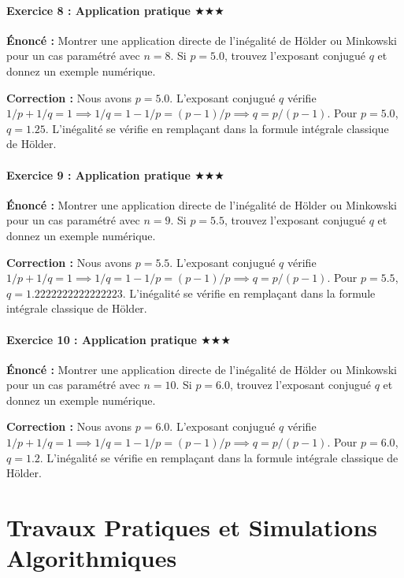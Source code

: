 \documentclass[11pt,a4paper]{article}
\begin{document}
\subsection*{Exercice 8 : Application pratique $\bigstar\bigstar\bigstar$}

\textbf{Énoncé :}
Montrer une application directe de l'inégalité de Hölder ou Minkowski pour un cas paramétré avec $n=8$.
Si $p=5.0$, trouvez l'exposant conjugué $q$ et donnez un exemple numérique.

\textbf{Correction :}
Nous avons $p = 5.0$.
L'exposant conjugué $q$ vérifie $1/p + 1/q = 1 \implies 1/q = 1 - 1/p = (p-1)/p \implies q = p/(p-1)$.
Pour $p = 5.0$, $q = 1.25$.
L'inégalité se vérifie en remplaçant dans la formule intégrale classique de Hölder.


\subsection*{Exercice 9 : Application pratique $\bigstar\bigstar\bigstar$}

\textbf{Énoncé :}
Montrer une application directe de l'inégalité de Hölder ou Minkowski pour un cas paramétré avec $n=9$.
Si $p=5.5$, trouvez l'exposant conjugué $q$ et donnez un exemple numérique.

\textbf{Correction :}
Nous avons $p = 5.5$.
L'exposant conjugué $q$ vérifie $1/p + 1/q = 1 \implies 1/q = 1 - 1/p = (p-1)/p \implies q = p/(p-1)$.
Pour $p = 5.5$, $q = 1.2222222222222223$.
L'inégalité se vérifie en remplaçant dans la formule intégrale classique de Hölder.


\subsection*{Exercice 10 : Application pratique $\bigstar\bigstar\bigstar$}

\textbf{Énoncé :}
Montrer une application directe de l'inégalité de Hölder ou Minkowski pour un cas paramétré avec $n=10$.
Si $p=6.0$, trouvez l'exposant conjugué $q$ et donnez un exemple numérique.

\textbf{Correction :}
Nous avons $p = 6.0$.
L'exposant conjugué $q$ vérifie $1/p + 1/q = 1 \implies 1/q = 1 - 1/p = (p-1)/p \implies q = p/(p-1)$.
Pour $p = 6.0$, $q = 1.2$.
L'inégalité se vérifie en remplaçant dans la formule intégrale classique de Hölder.




\newpage
\part{Travaux Pratiques et Simulations Algorithmiques}
\end{document}
